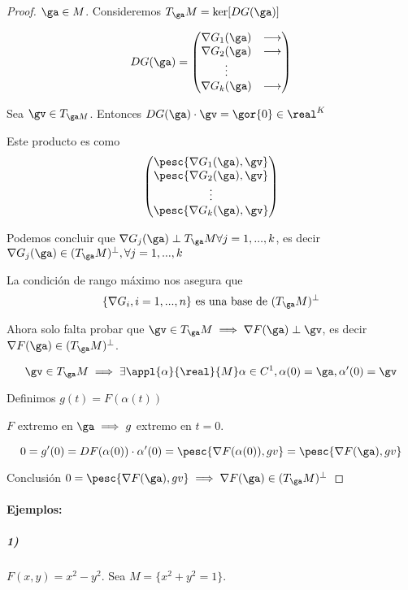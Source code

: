 \begin{proof}
$\ga \in M$. Consideremos $T_{\ga}M = \ker [DG(\ga)]$

\[DG(\ga) = \begin{pmatrix}
\nabla G_1(\ga) &\longrightarrow \\
\nabla G_2(\ga) &\longrightarrow \\
\vdots\\
\nabla G_k(\ga) &\longrightarrow 
\end{pmatrix}\]

Sea $\gv \in T_{\ga M}$. Entonces $DG(\ga)\cdot\gv = \gor{0}\in\real^K$

Este producto es como \[\begin{pmatrix}
\pesc{\nabla G_1(\ga),\gv}\\
\pesc{\nabla G_2(\ga),\gv}\\
\vdots\\
\pesc{\nabla G_k(\ga),\gv}
\end{pmatrix}\]

Podemos concluir que $\nabla G_j(\ga)\perp T_{\ga} M \forall j=1,...,k$, es decir $\nabla G_j(\ga) \in (T_{\ga}M)^\perp,\forall j=1,...,k$

La condición de rango máximo nos asegura que 
\[\{\nabla G_i, i = 1,...,n\} \text{ es una base de } (T_{\ga} M)^\perp\]

Ahora solo falta probar que  $\gv \in T_{\ga} M \implies \nabla F(\ga)\perp\gv$, es decir $\nabla F(\ga) \in (T_{\ga} M)^\perp$.

\[\gv \in T_{\ga} M \implies \exists \appl{\alpha}{\real}{M} \alpha \in C^1, \alpha(0) = \ga, \alpha'(0) = \gv\]

Definimos $g(t) = F(\alpha(t))$

$F$ extremo en $\ga \implies g$ extremo en $t=0$.

\[ 0 = g'(0) = DF(\alpha(0))\cdot \alpha'(0) = \pesc{\nabla F(\alpha(0)),gv} = \pesc{\nabla F(\ga),gv}\]

Conclusión $ 0 = \pesc{\nabla F(\ga),gv} \implies \nabla F(\ga) \in (T_{\ga}M)^\perp$

\end{proof}


\paragraph{Ejemplos:}

\subparagraph{1)} $F(x,y) = x^2-y^2$. Sea $M = \{x^2+y^2 = 1\}$.


